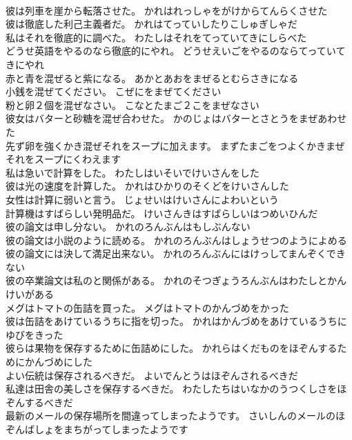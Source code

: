 \documentclass[8pt]{extreport}
\begin{document}
\begin{CJK}{UTF8}{min}
\\	彼は列車を崖から転落させた。	かれはれっしゃをがけからてんらくさせた 
\\	彼は徹底した利己主義者だ。	かれはてっていしたりこしゅぎしゃだ 
\\	私はそれを徹底的に調べた。	わたしはそれをてっていてきにしらべた 
\\	どうせ英語をやるのなら徹底的にやれ。	どうせえいごをやるのならてっていてきにやれ 
\\	赤と青を混ぜると紫になる。	あかとあおをまぜるとむらさきになる 
\\	小銭を混ぜてください。	こぜにをまぜてください 
\\	粉と卵２個を混ぜなさい。	こなとたまご２こをまぜなさい 
\\	彼女はバターと砂糖を混ぜ合わせた。	かのじょはバターとさとうをまぜあわせた 
\\	先ず卵を強くかき混ぜそれをスープに加えます。	まずたまごをつよくかきまぜそれをスープにくわえます 
\\	私は急いで計算をした。	わたしはいそいでけいさんをした 
\\	彼は光の速度を計算した。	かれはひかりのそくどをけいさんした 
\\	女性は計算に弱いと言う。	じょせいはけいさんによわいという 
\\	計算機はすばらしい発明品だ。	けいさんきはすばらしいはつめいひんだ 
\\	彼の論文は申し分ない。	かれのろんぶんはもしぶんない 
\\	彼の論文は小説のように読める。	かれのろんぶんはしょうせつのようによめる 
\\	彼の論文には決して満足出来ない。	かれのろんぶんにはけっしてまんぞくできない 
\\	彼の卒業論文は私のと関係がある。	かれのそつぎょうろんぶんはわたしとかんけいがある 
\\	メグはトマトの缶詰を買った。	メグはトマトのかんづめをかった 
\\	彼は缶詰をあけているうちに指を切った。	かれはかんづめをあけているうちにゆびをきった 
\\	彼らは果物を保存するために缶詰めにした。	かれらはくだものをほぞんするためにかんづめにした 
\\	よい伝統は保存されるべきだ。	よいでんとうはほぞんされるべきだ 
\\	私達は田舎の美しさを保存するべきだ。	わたしたちはいなかのうつくしさをほぞんするべきだ 
\\	最新のメールの保存場所を間違ってしまったようです。	さいしんのメールのほぞんばしょをまちがってしまったようです 

\end{CJK}
\end{document}
